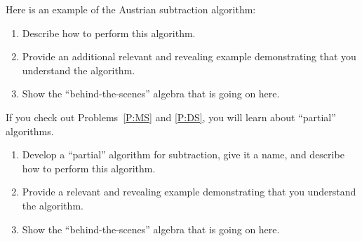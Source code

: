 \documentclass[nooutcomes]{ximera}
\begin{document}
\begin{problem}Here is an example of the Austrian subtraction
  algorithm:
\begin{image}
\end{image}
\begin{enumerate}
\item Describe how to perform this algorithm.
\item Provide an additional relevant and revealing example
  demonstrating that you understand the algorithm.
\item Show the ``behind-the-scenes'' algebra that is going on here.
\end{enumerate}
\end{problem} 

\begin{problem}If you check out Problems~\ref{P:MS} and \ref{P:DS}, you will
  learn about ``partial'' algorithms.
\begin{enumerate}
\item Develop a ``partial'' algorithm for subtraction, give it a name, and describe how to
  perform this algorithm.
\item Provide a relevant and revealing example demonstrating that you
  understand the algorithm.
\item Show the ``behind-the-scenes'' algebra that is going on here.
\end{enumerate}
\end{problem} 
\end{document}
